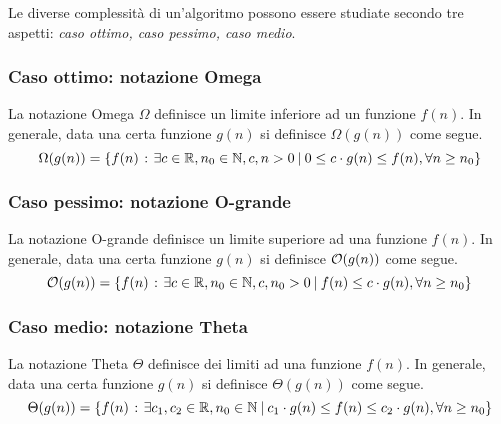 \documentclass{subfiles}
\begin{document}
Le diverse complessità di un'algoritmo possono essere studiate secondo tre aspetti: \emph{caso ottimo, caso pessimo, caso medio}.

\subsubsection{Caso ottimo: notazione Omega}
La notazione Omega \(\Omega\) definisce un limite inferiore ad un funzione \(f(n)\).
In generale, data una certa funzione \(g(n)\) si definisce \(\Omega(g(n))\) come segue.
\[
    \Omega(g(n)) = \left\{f(n) \operatorname{\: {:} \:} \exists c \in \mathbb{R}, n_{0} \in \mathbb{N}, c,n > 0 \:{|}\: 0 \le c \cdot g(n) \le f(n), \forall n \ge n_{0}\right\}
\]
\subsubsection{Caso pessimo: notazione O-grande}
La notazione O-grande definisce un limite superiore ad una funzione \(f(n)\).
In generale, data una certa funzione \(g(n)\) si definisce \(\order{g(n)}\) come segue.
\[
    \order{g(n)} = \set{f(n)}{\exists c \in \R, n_{0} \in \N , c, n_{0} > 0 \given f(n) \le c \cdot g(n), \forall n \ge n_{0}}
\]
\subsubsection{Caso medio: notazione Theta}
La notazione Theta \(\Theta\) definisce dei limiti ad una funzione \(f(n)\).
In generale, data una certa funzione \(g(n)\) si definisce \(\Theta(g(n))\) come segue.
\[
    \Theta(g(n)) = \left\{f(n) \operatorname{\: {:} \:} \exists c_{1}, c_{2} \in \mathbb{R}, n_{0} \in \mathbb{N} \:{|}\: c_{1} \cdot g(n) \le f(n) \le c_{2} \cdot g(n), \forall n \ge n_{0}\right\}
\]
\end{document}
